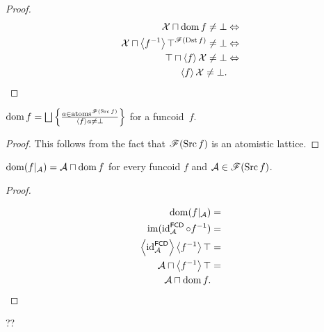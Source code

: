 \begin{proof}
~
\begin{align*}
\mathcal{X}\sqcap\operatorname{dom} f\ne\bot & \Leftrightarrow\\
\mathcal{X}\sqcap\left\langle f^{-1}\right\rangle\top^{\mathscr{F}(\operatorname{Dst}
f)}\ne\bot & \Leftrightarrow\\
\top\sqcap\left\langle f\right\rangle\mathcal{X}\ne\bot & \Leftrightarrow\\
\left\langle f\right\rangle\mathcal{X}\ne\bot.
\end{align*}
\end{proof}
\begin{cor}\label{dom-fcd-at}
$\dom f=\bigsqcup\setcond{a\in\atoms^{\mathscr{F}(\Src f)}}{\supfun
fa\ne\bot}$ for a funcoid~$f$.
\end{cor}
\begin{proof}
This follows from the fact that $\mathscr{F}(\operatorname{Src} f)$ is an atomistic
lattice.\end{proof}
\begin{prop}
$\operatorname{dom}(f|_{\mathcal{A}})=\mathcal{A}\sqcap\operatorname{dom} f$ for every funcoid
$f$ and $\mathcal{A}\in\mathscr{F}(\operatorname{Src} f)$.\end{prop}
\begin{proof}
~

\begin{align*}
\operatorname{dom}(f|_{\mathcal{A}}) & =\\
\operatorname{im}(\operatorname{id}_{\mathcal{A}}^{\mathsf{FCD}}\circ f^{-1}) & =\\
\left\langle \operatorname{id}_{\mathcal{A}}^{\mathsf{FCD}}\right\rangle\left\langle f^{-1}\right\rangle\top & =\\
\mathcal{A}\sqcap\left\langle f^{-1}\right\rangle\top & =\\
\mathcal{A}\sqcap\operatorname{dom} f.
\end{align*}
\end{proof}

\begin{cor}
??
\end{cor}

